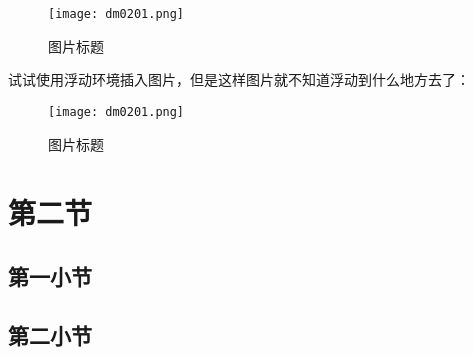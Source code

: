 			\begin{figure}[htbp]                        %
				\centering                              %
				\texttt{[image: dm0201.png]} %
				\caption{图片标题}            %
				\label{dm0202}                %
			\end{figure}

			试试使用浮动环境插入图片，但是这样图片就不知道浮动到什么地方去了：

			\begin{figure}[htbp]                        %
				\centering                              %
				\texttt{[image: dm0201.png]} %
				\caption{图片标题}            %
				\label{dm0203}                %
			\end{figure}


	\section{第二节}

		\subsection{第一小节}

		\subsection{第二小节}
